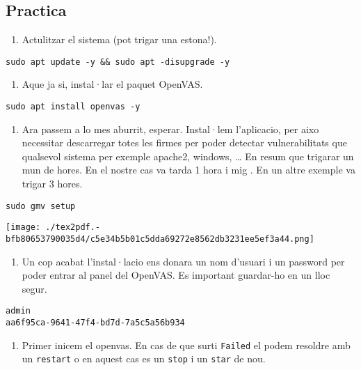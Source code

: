 \documentclass[]{article}
\providecommand{\tightlist}{%
  \setlength{\itemsep}{0pt}\setlength{\parskip}{0pt}}
\begin{document}
\hypertarget{practica}{%
\subsection{\texorpdfstring{\textbf{Practica}}{Practica}}\label{practica}}

\begin{enumerate}
\def\labelenumi{\arabic{enumi}.}
\tightlist
\item
  Actulitzar el sistema (pot trigar una estona!).
\end{enumerate}

\texttt{sudo\ apt\ update\ -y\ \&\&\ sudo\ apt\ -disupgrade\ -y}

\begin{enumerate}
\def\labelenumi{\arabic{enumi}.}
\setcounter{enumi}{1}
\tightlist
\item
  Aque ja si, instal·lar el paquet OpenVAS.
\end{enumerate}

\texttt{sudo\ apt\ install\ openvas\ -y}

\begin{enumerate}
\def\labelenumi{\arabic{enumi}.}
\setcounter{enumi}{2}
\tightlist
\item
  Ara passem a lo mes aburrit, esperar. Instal·lem l'aplicacio, per aixo
  necessitar descarregar totes les firmes per poder detectar
  vulnerabilitats que qualsevol sistema per exemple apache2, windows,
  \ldots{} En resum que trigarar un mun de hores. En el nostre cas va
  tarda 1 hora i mig . En un altre exemple va trigar 3 hores.
\end{enumerate}

\texttt{sudo\ gmv\ setup}

\texttt{[image: ./tex2pdf.-bfb80653790035d4/c5e34b5b01c5dda69272e8562db3231ee5ef3a44.png]}

\begin{enumerate}
\def\labelenumi{\arabic{enumi}.}
\setcounter{enumi}{3}
\tightlist
\item
  Un cop acabat l'instal·lacio ens donara un nom d'usuari i un password
  per poder entrar al panel del OpenVAS. Es important guardar-ho en un
  lloc segur.
\end{enumerate}

\begin{verbatim}
admin
aa6f95ca-9641-47f4-bd7d-7a5c5a56b934
\end{verbatim}

\begin{enumerate}
\def\labelenumi{\arabic{enumi}.}
\setcounter{enumi}{4}
\tightlist
\item
  Primer inicem el openvas. En cas de que surti \texttt{Failed} el podem
  resoldre amb un \texttt{restart} o en aquest cas es un \texttt{stop} i
  un \texttt{star} de nou.
\end{enumerate}
\end{document}
